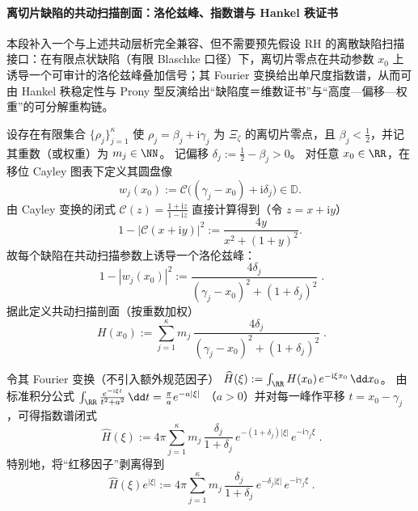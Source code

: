 \paragraph{离切片缺陷的共动扫描剖面：洛伦兹峰、指数谱与 Hankel 秩证书}
本段补入一个与上述共动层析完全兼容、但不需要预先假设 RH 的离散缺陷扫描接口：在有限点状缺陷（有限 Blaschke 口径）下，离切片零点在共动参数 \(x_0\) 上诱导一个可审计的洛伦兹峰叠加信号；其 Fourier 变换给出单尺度指数谱，从而可由 Hankel 秩稳定性与 Prony 型反演给出“缺陷度＝维数证书”与“高度—偏移—权重”的可分解重构链。
\par
设存在有限集合 \(\{\rho_j\}_{j=1}^{\kappa}\) 使 \(\rho_j=\beta_j+\mathrm{i}\gamma_j\) 为 \(\Xi_{\zeta}\) 的离切片零点，且 \(\beta_j<\tfrac12\)，并记其重数（或权重）为 \(m_j\in\NN\)。
记偏移 \(\delta_j:=\tfrac12-\beta_j>0\)。
对任意 \(x_0\in\RR\)，在移位 Cayley 图表下定义其圆盘像
\[
w_{j}(x_0):=\mathcal{C}\bigl((\gamma_j-x_0)+\mathrm{i}\delta_j\bigr)\in\mathbb{D}.
\]
由 Cayley 变换的闭式
\(
\mathcal{C}(z)=\frac{1+\mathrm{i}z}{1-\mathrm{i}z}
\)
直接计算得到（令 \(z=x+\mathrm{i}y\)）
\[
1-\bigl|\mathcal{C}(x+\mathrm{i}y)\bigr|^2
:=\frac{4y}{x^2+(1+y)^2}.
\]
故每个缺陷在共动扫描参数上诱导一个洛伦兹峰：
\begin{equation}\label{eq:xi-comoving-scan-lorentz-peak}
\boxed{\;
1-|w_{j}(x_0)|^2
:=\frac{4\delta_j}{(\gamma_j-x_0)^2+(1+\delta_j)^2}\; }.
\end{equation}
据此定义共动扫描剖面（按重数加权）
\begin{equation}\label{eq:xi-comoving-scan-profile-H}
\boxed{\;
H(x_0):=\sum_{j=1}^{\kappa}m_j\,\frac{4\delta_j}{(\gamma_j-x_0)^2+(1+\delta_j)^2}\; }.
\end{equation}
\par
令其 Fourier 变换（不引入额外规范因子）
\(
\widehat H(\xi):=\int_{\RR}H(x_0)\,e^{-\mathrm{i}\xi x_0}\,\dd x_0
\)。
由标准积分公式
\(
\int_{\RR}\frac{e^{-\mathrm{i}\xi t}}{t^2+a^2}\,\dd t=\frac{\pi}{a}e^{-a|\xi|}
\)
（\(a>0\)）并对每一峰作平移 \(t=x_0-\gamma_j\)，可得指数谱闭式
\begin{equation}\label{eq:xi-comoving-scan-fourier}
\boxed{\;
\widehat H(\xi)
:=4\pi\sum_{j=1}^{\kappa}m_j\,\frac{\delta_j}{1+\delta_j}\,e^{-(1+\delta_j)|\xi|}\,e^{-\mathrm{i}\gamma_j\xi}\; }.
\end{equation}
特别地，将“红移因子”剥离得到
\begin{equation}\label{eq:xi-comoving-scan-exp-spectrum}
\boxed{\;
\widehat H(\xi)e^{|\xi|}
:=4\pi\sum_{j=1}^{\kappa}m_j\,\frac{\delta_j}{1+\delta_j}\,e^{-\delta_j|\xi|}\,e^{-\mathrm{i}\gamma_j\xi}\; }.
\end{equation}

